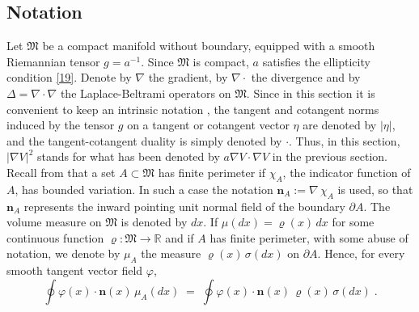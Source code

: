 \documentclass[reqno]{amsart}
\newcounter{as}[section]
\newcommand{\mf}[1]{{\mathfrak #1}}
\newcommand{\bb}[1]{{\mathbb #1}}
\newcommand{\bs}[1]{{\boldsymbol #1}}
\newcommand{\<}{\langle}
\renewcommand{\>}{\rangle}
\begin{document}
\subsection{Notation}
Let $\mf M$ be a compact manifold without boundary, equipped with a smooth Riemannian tensor $g=a^{-1}$. Since $\mf M$ is compact, $a$ satisfies the ellipticity condition \eqref{19}. Denote by $\nabla$ the gradient,
by $\nabla \cdot$ the divergence and by $\Delta=\nabla\cdot \nabla$ the Laplace-Beltrami operators on $\mf M$. Since in this section it is convenient to keep an intrinsic notation , the tangent and cotangent norms induced by the tensor $g$ on a tangent or cotangent vector $\eta$ are denoted by $|\eta|$, and the tangent-cotangent duality is simply denoted by $\cdot$. Thus, in this section,  $|\nabla V|^2$ stands for what has been denoted by $a \nabla V \cdot \nabla V$ in the previous section.
Recall from \cite[Definition 3.35, page 143]{afp} that a set $A\subset
\mf M$ has finite perimeter if $\chi_A$, the indicator function of $A$, has bounded variation.
 In such a case the notation $\bs
n_A:=\nabla \, \chi_A$ is used, so that $\bs n_A$ represents the
inward pointing unit normal field of the boundary $\partial A$. The
volume measure on $\mf M$ is denoted by $dx$. If $\mu(dx) =\varrho
(x)\, dx$ for some continuous function $\varrho\colon\mf M\to \bb R$ and if
$A$ has finite perimeter, with some abuse of notation, we denote by
$\mu_A$ the measure $\varrho(x) \, \sigma(dx)$ on $\partial A$. Hence,
for every smooth tangent vector field $\varphi$,
\begin{equation*}
\oint \varphi (x) \cdot \bs n (x) \, \mu_A(dx)
\;=\; \oint \varphi  (x) \cdot \bs n (x) \, \varrho(x)
\, \sigma (d x)\;.
\end{equation*}
\end{document}

